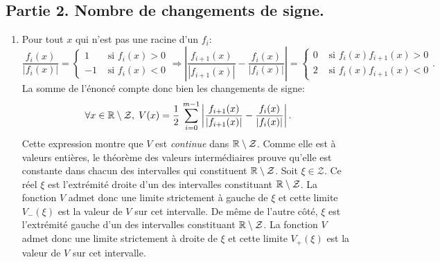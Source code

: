 \subsection*{Partie 2. Nombre de changements de signe.}
\begin{enumerate}
  \item Pour tout $x$ qui n'est pas une racine d'un $f_i$:
\[
  \frac{f_i(x)}{\left| f_i(x)\right|}
  = \left\lbrace
  \begin{aligned}
    1 &\text{ si } f_i(x) > 0 \\ -1 &\text{ si } f_i(x) < 0
  \end{aligned}
  \right. 
  \Rightarrow
  \left| \frac{f_{i+1}(x)}{\left| f_{i+1}(x)\right|} - \frac{f_i(x)}{\left| f_i(x)\right|} \right|
    = \left\lbrace
  \begin{aligned}
    0 &\text{ si } f_i(x)f_{i+1}(x) > 0 \\ 2 &\text{ si } f_i(x)f_{i+1}(x) < 0
  \end{aligned}
  \right. .
\]
La somme de l'énoncé compte donc bien les changements de signe:
\[
  \forall x \in \mathbb{R} \setminus \mathcal{Z}, \; V(x) = 
  \frac{1}{2}\,\sum_{i=0}^{m-1} \left|\frac{f_{i+1}(x)}{\left| f_{i+1}(x)\right|} - \frac{f_{i}(x)}{\left| f_{i}(x)\right|} \right| .  
\]
Cette expression montre que $V$ est \emph{continue} dans $\mathbb{R} \setminus \mathcal{Z}$. Comme elle est à valeurs entières, le théorème des valeurs intermédiaires prouve qu'elle est constante dans chacun des intervalles qui constituent $\mathbb{R} \setminus \mathcal{Z}$.\newline
Soit $\xi \in \mathcal{Z}$. Ce réel $\xi$ est l'extrémité droite d'un des intervalles constituant $\mathbb{R} \setminus \mathcal{Z}$. La fonction $V$ admet donc une limite strictement à gauche de $\xi$ et cette limite $V_-(\xi)$ est la valeur de $V$ sur cet intervalle. De même de l'autre côté, $\xi$ est l'extrémité gauche d'un des intervalles constituant $\mathbb{R} \setminus \mathcal{Z}$. La fonction $V$ admet donc une limite strictement à droite de $\xi$ et cette limite $V_+(\xi)$ est la valeur de $V$ sur cet intervalle. 
  

\end{enumerate}
